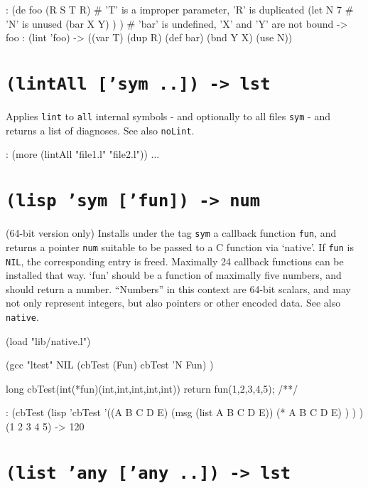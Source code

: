 \begin{wideverbatim}
: (de foo (R S T R)     # 'T' is a improper parameter, 'R' is duplicated
   (let N 7             # 'N' is unused
      (bar X Y) ) )     # 'bar' is undefined, 'X' and 'Y' are not bound
-> foo
: (lint 'foo)
-> ((var T) (dup R) (def bar) (bnd Y X) (use N))
\end{wideverbatim}

 
\section*{\texttt{(lintAll ['sym ..]) -> lst}}
\label{sec:func-ref-L-(lintAll ['sym ..]) -> lst}


Applies \texttt{lint} to \texttt{all} internal symbols - and optionally to all files
\texttt{sym} - and returns a list of diagnoses. See also \texttt{noLint}.


\begin{wideverbatim}
: (more (lintAll "file1.l" "file2.l"))
...
\end{wideverbatim}

 
\section*{\texttt{(lisp 'sym ['fun]) -> num}}
\label{sec:func-ref-L-(lisp 'sym ['fun]) -> num}


(64-bit version only) Installs under the tag \texttt{sym} a callback function
\texttt{fun}, and returns a pointer \texttt{num} suitable to be passed to a C function
via `native'. If \texttt{fun} is \texttt{NIL}, the corresponding entry is freed.
Maximally 24 callback functions can be installed that way. `fun' should
be a function of maximally five numbers, and should return a number.
``Numbers'' in this context are 64-bit scalars, and may not only represent
integers, but also pointers or other encoded data. See also \texttt{native}.


\begin{wideverbatim}
(load "lib/native.l")

(gcc "ltest" NIL
   (cbTest (Fun) cbTest 'N Fun) )

long cbTest(int(*fun)(int,int,int,int,int)) {
   return fun(1,2,3,4,5);
}
/**/

: (cbTest
   (lisp 'cbTest
      '((A B C D E)
         (msg (list A B C D E))
         (* A B C D E) ) ) )
(1 2 3 4 5)
-> 120
\end{wideverbatim}

 
\section*{\texttt{(list 'any ['any ..]) -> lst}}
\label{sec:func-ref-L-(list 'any ['any ..]) -> lst}


